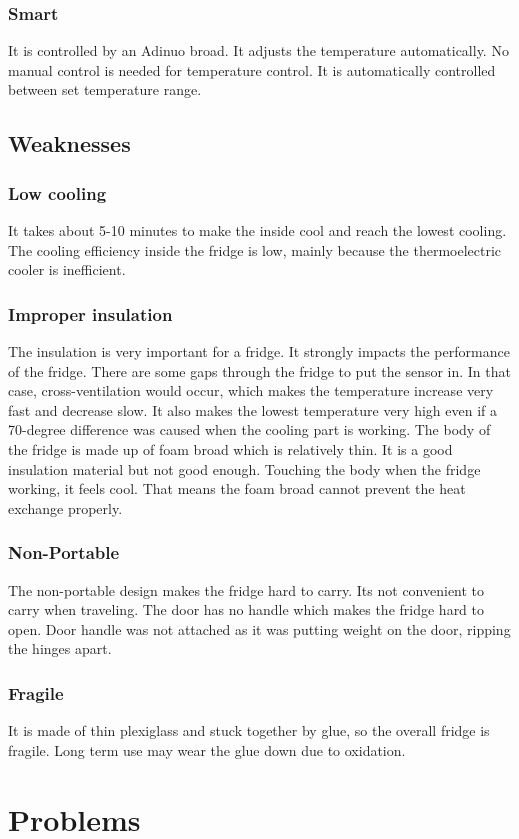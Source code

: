 \documentclass[12pt,onecolumn]{article}
\begin{document}
\subsubsection{Smart}
It is controlled by an Adinuo broad. It adjusts the temperature automatically. No manual control is needed for temperature control. It is automatically controlled between set temperature range. 
\subsection{Weaknesses}
\subsubsection{Low cooling}
It takes about 5-10 minutes to make the inside cool and reach the lowest cooling. The cooling efficiency inside the fridge is low, mainly because the thermoelectric cooler is inefficient.
\subsubsection{Improper insulation}
The insulation is very important for a fridge. It strongly impacts the performance of the fridge. There are some gaps through the fridge to put the sensor in. In that case, cross-ventilation would occur, which makes the temperature increase very fast and decrease slow. It also makes the lowest temperature very high even if a 70-degree difference was caused when the cooling part is working. The body of the fridge is made up of foam broad which is relatively thin. It is a good insulation material but not good enough. Touching the body when the fridge working, it feels cool. That means the foam broad cannot prevent the heat exchange properly.
\subsubsection{Non-Portable}
The non-portable design makes the fridge hard to carry. Its not convenient to carry when traveling. The door has no handle which makes the fridge hard to open. Door handle was not attached as it was putting weight on the door, ripping the hinges apart. 
\subsubsection{Fragile}
It is made of thin plexiglass and stuck together by glue, so the overall fridge is fragile. Long term use may wear the glue down due to oxidation. 

\section{Problems}
\end{document}
